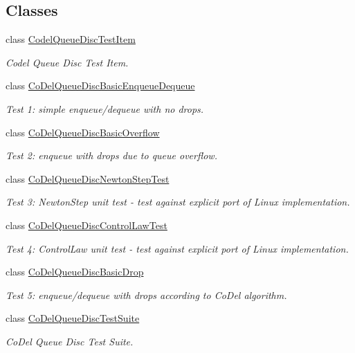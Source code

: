 \subsection*{Classes}
\begin{DoxyCompactItemize}
\item 
class \hyperlink{classCodelQueueDiscTestItem}{Codel\+Queue\+Disc\+Test\+Item}
\begin{DoxyCompactList}\small\item\em Codel Queue Disc Test Item. \end{DoxyCompactList}\item 
class \hyperlink{classCoDelQueueDiscBasicEnqueueDequeue}{Co\+Del\+Queue\+Disc\+Basic\+Enqueue\+Dequeue}
\begin{DoxyCompactList}\small\item\em Test 1\+: simple enqueue/dequeue with no drops. \end{DoxyCompactList}\item 
class \hyperlink{classCoDelQueueDiscBasicOverflow}{Co\+Del\+Queue\+Disc\+Basic\+Overflow}
\begin{DoxyCompactList}\small\item\em Test 2\+: enqueue with drops due to queue overflow. \end{DoxyCompactList}\item 
class \hyperlink{classCoDelQueueDiscNewtonStepTest}{Co\+Del\+Queue\+Disc\+Newton\+Step\+Test}
\begin{DoxyCompactList}\small\item\em Test 3\+: Newton\+Step unit test -\/ test against explicit port of Linux implementation. \end{DoxyCompactList}\item 
class \hyperlink{classCoDelQueueDiscControlLawTest}{Co\+Del\+Queue\+Disc\+Control\+Law\+Test}
\begin{DoxyCompactList}\small\item\em Test 4\+: Control\+Law unit test -\/ test against explicit port of Linux implementation. \end{DoxyCompactList}\item 
class \hyperlink{classCoDelQueueDiscBasicDrop}{Co\+Del\+Queue\+Disc\+Basic\+Drop}
\begin{DoxyCompactList}\small\item\em Test 5\+: enqueue/dequeue with drops according to Co\+Del algorithm. \end{DoxyCompactList}\item 
class \hyperlink{classCoDelQueueDiscTestSuite}{Co\+Del\+Queue\+Disc\+Test\+Suite}
\begin{DoxyCompactList}\small\item\em Co\+Del Queue Disc Test Suite. \end{DoxyCompactList}\end{DoxyCompactItemize}
